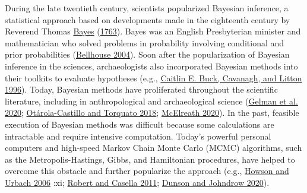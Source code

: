 \documentclass[
]{article}
\begin{document}
During the late twentieth century, scientists popularized Bayesian
inference, a statistical approach based on developments made in the
eighteenth century by Reverend Thomas
\protect\hyperlink{ref-bayes_essay_1763}{Bayes}
(\protect\hyperlink{ref-bayes_essay_1763}{1763}). Bayes was an English
Presbyterian minister and mathematician who solved problems in
probability involving conditional and prior probabilities
(\protect\hyperlink{ref-bellhouse_reverend_2004}{Bellhouse 2004}). Soon
after the popularization of Bayesian inference in the sciences,
archaeologists also incorporated Bayesian methods into their toolkits to
evaluate hypotheses (e.g.,
\protect\hyperlink{ref-buck_bayesian_1996}{Caitlin E. Buck, Cavanagh,
and Litton 1996}). Today, Bayesian methods have proliferated throughout
the scientific literature, including in anthropological and
archaeological science
(\protect\hyperlink{ref-gelman_bayesian_2020}{Gelman et al. 2020};
\protect\hyperlink{ref-otarola-castillo_bayesian_2018}{Otárola-Castillo
and Torquato 2018};
\protect\hyperlink{ref-mcelreath_statistical_2020}{McElreath 2020}). In
the past, feasible execution of Bayesian methods was difficult because
some calculations are intractable and require intensive computation.
Today's powerful personal computers and high-speed Markov Chain Monte
Carlo (MCMC) algorithms, such as the Metropolis-Hastings, Gibbs, and
Hamiltonian procedures, have helped to overcome this obstacle and
further popularize the approach (e.g.,
\protect\hyperlink{ref-howson_scientific_2006}{Howson and Urbach 2006}
:xi; \protect\hyperlink{ref-robert_short_2011}{Robert and Casella 2011};
\protect\hyperlink{ref-dunson_hastings_2020}{Dunson and Johndrow 2020}).
\end{document}
